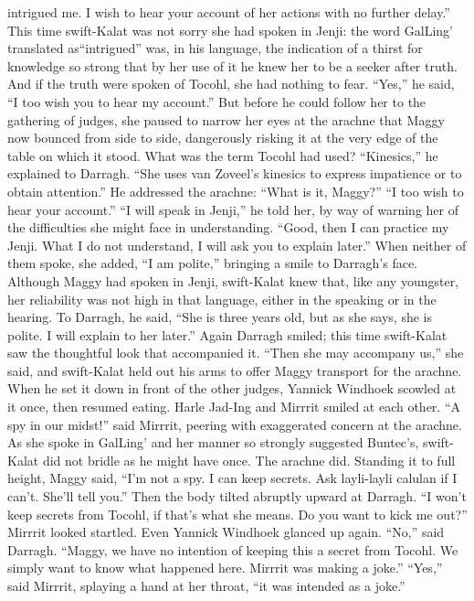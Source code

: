 \documentclass[9pt]{article}
\begin{document}
intrigued me. I wish to hear your account of her actions with no further delay.”
This time swift-Kalat was not sorry she had spoken in Jenji: the word GalLing’ translated as“intrigued” was, in his language, the indication of a thirst for knowledge so strong that by her use of it he
knew her to be a seeker after truth. And if the truth were spoken of Tocohl, she had nothing to fear.
“Yes,” he said, “I too wish you to hear my account.”
But before he could follow her to the gathering of judges, she paused to narrow her eyes at the
arachne that Maggy now bounced from side to side, dangerously risking it at the very edge of the table
on which it stood.
What was the term Tocohl had used? “Kinesics,” he explained to Darragh. “She uses van Zoveel’s
kinesics to express impatience or to obtain attention.” He addressed the arachne: “What is it, Maggy?”
“I too wish to hear your account.”
“I will speak in Jenji,” he told her, by way of warning her of the difficulties she might face in
understanding.
“Good, then I can practice my Jenji. What I do not understand, I will ask you to explain later.” When
neither of them spoke, she added, “I am polite,” bringing a smile to Darragh’s face.
Although Maggy had spoken in Jenji, swift-Kalat knew that, like any youngster, her reliability was
not high in that language, either in the speaking or in the hearing. To Darragh, he said, “She is three years
old, but as she says, she is polite. I will explain to her later.”
Again Darragh smiled; this time swift-Kalat saw the thoughtful look that accompanied it. “Then she
may accompany us,” she said, and swift-Kalat held out his arms to offer Maggy transport for the
arachne.
When he set it down in front of the other judges, Yannick Windhoek scowled at it once, then
resumed eating. Harle Jad-Ing and Mirrrit smiled at each other. “A spy in our midst!” said Mirrrit,
peering with exaggerated concern at the arachne. As she spoke in GalLing’ and her manner so strongly
suggested Buntec’s, swift-Kalat did not bridle as he might have once.
The arachne did. Standing it to full height, Maggy said, “I’m not a spy. I can keep secrets. Ask
layli-layli calulan if I can’t. She’ll tell you.” Then the body tilted abruptly upward at Darragh. “I won’t
keep secrets from Tocohl, if that’s what she means. Do you want to kick me out?”
Mirrrit looked startled. Even Yannick Windhoek glanced up again. “No,” said Darragh. “Maggy, we
have no intention of keeping this a secret from Tocohl. We simply want to know what happened here.
Mirrrit was making a joke.”
“Yes,” said Mirrrit, splaying a hand at her throat, “it was intended as a joke.”
\end{document}
